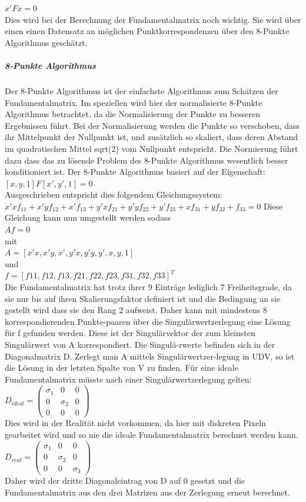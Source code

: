 $x'Fx = 0$
\\
Dies wird bei der Berechnung der Fundamentalmatrix noch wichtig. Sie wird über einen einen Datensatz an möglichen Punktkorrespondenzen über den 8-Punkte Algorithmus geschätzt. \cite{Richard2000}

\subparagraph{8-Punkte Algorithmus}
Der 8-Punkte Algorithmus ist der einfachste Algorithmus zum Schätzen der Fundamentalmatrix. Im speziellen wird hier der normalisierte 8-Punkte Algorithmus betrachtet, da die Normalisierung der Punkte zu besseren Ergebnissen führt.
Bei der Normalisierung werden die Punkte so verschoben, dass ihr Mittelpunkt der Nullpunkt ist, und zusätzlich so skaliert, dass deren Abstand im quadratischen Mittel sqrt(2) vom Nullpunkt entspricht. Die Normierung führt dazu dass das zu lösende Problem des 8-Punkte Algorithmus wesentlich besser konditioniert ist.
Der 8-Punkte Algorithmus basiert auf der Eigenschaft:
\\
$[x,y,1] F [x',y',1] = 0$
\\
Ausgeschrieben entspricht dies folgendem Gleichungssystem:
\\
$x'xf_{11} + x'yf_{12}  + x'f_{13} + y'xf_{21} + y'yf_{22} + y'f_{23} + xf_{31} + yf_{32} + f_{33} = 0$
Diese Gleichung kann nun umgestellt werden sodass
\\
$Af = 0$
\\
mit
\\
$A = [x'x, x'y, x', y'x, y'y, y', x,y,1]$
\\
und
\\
$f = [f11,f12,f13,f21,f22,f23,f31,f32,f33]^T$
\\
Die Fundamentalmatrix hat trotz ihrer 9 Einträge lediglich 7 Freiheitsgrade, da sie nur bis auf ihren Skalierungsfaktor definiert ist und die Bedingung an sie gestellt wird dass sie den Rang 2 aufweist. Daher kann mit mindestens 8 korrespondierenden Punkte-paaren über die Singulärwertzerlegung eine Lösung für f gefunden werden. Diese ist der Singulärvektor der zum kleinsten Singulärwert von A korrespondiert. Die Singulä-rwerte befinden sich in der Diagonalmatrix D. Zerlegt man A mittels Singulärwertzer-legung in UDV, so ist die Lösung in der letzten Spalte von V zu finden.
Für eine ideale Fundamentalmatrix müsste nach einer Singulärwertzerlegung gelten:
\\
$D_{ideal} = \begin{pmatrix} \sigma_1 & 0 & 0\\0 & \sigma_2 & 0 \\0 & 0 & 0 \end{pmatrix}$
\\
Dies wird in der Realität nicht vorkommen, da hier mit diskreten Pixeln gearbeitet wird und so nie die ideale Fundamentalmatrix berechnet werden kann.
\\
$D_{real} = \begin{pmatrix} \sigma_1 & 0 & 0\\0 & \sigma_2 & 0 \\0 & 0 & \sigma_3 \end{pmatrix}$
\\
Daher wird der dritte Diagonaleintrag von D auf 0 gesetzt und die Fundamentalmatrix aus den drei Matrizen aus der Zerlegung erneut berechnet. \cite{Richard2000} \cite{Schreer2005}

